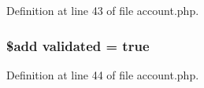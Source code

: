 Definition at line 43 of file account.\+php.

\subsubsection[{\texorpdfstring{validated}{validated}}]{\setlength{\rightskip}{0pt plus 5cm}\${\bf add} validated = true}\hypertarget{actions_2account_8php_a2e76c73baded04b16081921afc8a709f}{}\label{actions_2account_8php_a2e76c73baded04b16081921afc8a709f}


Definition at line 44 of file account.\+php.

